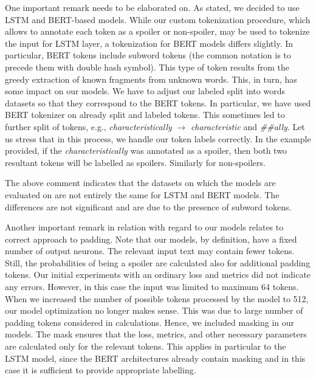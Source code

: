 \documentclass[11pt]{article}
\begin{document}
One important remark needs to be elaborated on. As stated, we decided to use LSTM and BERT-based models. While our custom tokenization procedure, which allows to annotate each token as a spoiler or non-spoiler, may be used to tokenize the input for LSTM layer, a tokenization for BERT models differs slightly. In particular, BERT tokens include subword tokens (the common notation is to precede them with double hash symbol). This type of token results from the greedy extraction of known fragments from unknown words. This, in turn, has some impact on our models. We have to adjust our labeled split into words datasets so that they correspond to the BERT tokens. In particular, we have used BERT tokenizer on already split and labeled tokens. This sometimes led to further split of tokens, e.g., \textit{characteristically} $\to$ \textit{characteristic} and \textit{\#\#ally}. Let us stress that in this process, we handle our token labels correctly. In the example provided, if the \textit{characteristically} was annotated as a spoiler, then both two resultant tokens will be labelled as spoilers. Similarly for non-spoilers.

The above comment indicates that the datasets on which the models are evaluated on are not entirely the same for LSTM and BERT models. The differences are not significant and are due to the presence of subword tokens.

Another important remark in relation with regard to our models relates to correct approach to padding. Note that our models, by definition, have a fixed number of output neurons. The relevant input text may contain fewer tokens. Still, the probabilities of being a spoiler are calculated also for additional padding tokens. Our initial experiments with an ordinary loss and metrics did not indicate any errors. However, in this case the input was limited to maximum 64 tokens. When we increased the number of possible tokens processed by the model to 512, our model optimization no longer makes sense. This was due to large number of padding tokens considered in calculations. Hence, we included masking in our models. The mask ensures that the loss, metrics, and other necessary parameters are calculated only for the relevant tokens. This applies in particular to the LSTM model, since the BERT architectures already contain masking and in this case it is sufficient to provide appropriate labelling. 
\end{document}
